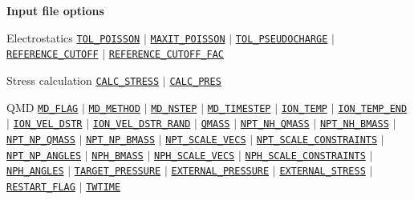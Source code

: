 \begin{frame}[allowframebreaks]{\textbf{Input file options}}
  \vspace{-2mm}
  \begin{block}{Electrostatics}
  \hyperlink{TOL_POISSON}{\texttt{TOL\_POISSON}} $\vert$
  \hyperlink{MAXIT_POISSON}{\texttt{MAXIT\_POISSON}} $\vert$
  \hyperlink{TOL_PSEUDOCHARGE}{\texttt{TOL\_PSEUDOCHARGE}} $\vert$
  \hyperlink{REFERENCE_CUTOFF}{\texttt{REFERENCE\_CUTOFF}} $\vert$
  \hyperlink{REFERENCE_CUTOFF_FAC}{\texttt{REFERENCE\_CUTOFF\_FAC}} 
  \end{block}
  
  \vspace{-2mm}
  \begin{block}{Stress calculation}
  \hyperlink{CALC_STRESS}{\texttt{CALC\_STRESS}} $\vert$
  \hyperlink{CALC_PRES}{\texttt{CALC\_PRES}}
  \end{block}
  \vspace{-2mm}
  
  \begin{block}{QMD}
  \hyperlink{MD_FLAG}{\texttt{MD\_FLAG}} $\vert$
  \hyperlink{MD_METHOD}{\texttt{MD\_METHOD}} $\vert$
  \hyperlink{MD_NSTEP}{\texttt{MD\_NSTEP}} $\vert$
  \hyperlink{MD_TIMESTEP}{\texttt{MD\_TIMESTEP}} $\vert$
  \hyperlink{ION_TEMP}{\texttt{ION\_TEMP}} $\vert$
  \hyperlink{ION_TEMP_END}{\texttt{ION\_TEMP\_END}} $\vert$
  \hyperlink{ION_VEL_DSTR}{\texttt{ION\_VEL\_DSTR}} $\vert$
  \hyperlink{ION_VEL_DSTR_RAND}{\texttt{ION\_VEL\_DSTR\_RAND}} $\vert$
  \hyperlink{QMASS}{\texttt{QMASS}} $\vert$
  \hyperlink{NPT_NH_QMASS}{\texttt{NPT\_NH\_QMASS}} $\vert$
  \hyperlink{NPT_NH_BMASS}{\texttt{NPT\_NH\_BMASS}} $\vert$
  \hyperlink{NPT_NP_QMASS}{\texttt{NPT\_NP\_QMASS}} $\vert$
  \hyperlink{NPT_NP_BMASS}{\texttt{NPT\_NP\_BMASS}} $\vert$
  \hyperlink{NPT_SCALE_VECS}{\texttt{NPT\_SCALE\_VECS}} $\vert$
  \hyperlink{NPT_SCALE_CONSTRAINTS}{\texttt{NPT\_SCALE\_CONSTRAINTS}} $\vert$ 
  \hyperlink{NPT_NP_ANGLES}{\texttt{NPT\_NP\_ANGLES}} $\vert$ 
  \hyperlink{NPH_BMASS}{\texttt{NPH\_BMASS}} $\vert$
  \hyperlink{NPH_SCALE_VECS}{\texttt{NPH\_SCALE\_VECS}} $\vert$
  \hyperlink{NPH_SCALE_CONSTRAINTS}{\texttt{NPH\_SCALE\_CONSTRAINTS}} $\vert$ 
  \hyperlink{NPH_ANGLES}{\texttt{NPH\_ANGLES}} $\vert$ 
  \hyperlink{TARGET_PRESSURE}{\texttt{TARGET\_PRESSURE}} $\vert$
  \hyperlink{EXTERNAL_PRESSURE}{\texttt{EXTERNAL\_PRESSURE}} $\vert$
  \hyperlink{EXTERNAL_STRESS}{\texttt{EXTERNAL\_STRESS}} $\vert$
  \hyperlink{RESTART_FLAG}{\texttt{RESTART\_FLAG}} $\vert$
  \hyperlink{TWTIME}{\texttt{TWTIME}}
  \end{block}
  

\end{frame}
